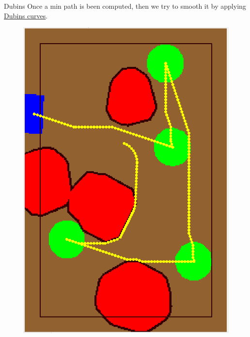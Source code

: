 \begin{frame}[fragile]{Dubins}
Once a min path is been computed, then we try to smooth it by applying \href{https://icosac.github.io/LabRoboticsProject/html/dubins_8hh.html}{Dubins curves}. 
\begin{figure}[H]
	\begin{minipage}{0.45\linewidth}
		\includegraphics[scale=0.15]{Immagini/map000}
	\end{minipage}
	\vspace{0.10\linewidth}
	\begin{minipage}{0.45\linewidth}

\end{minipage}
\end{figure}
\end{frame}
